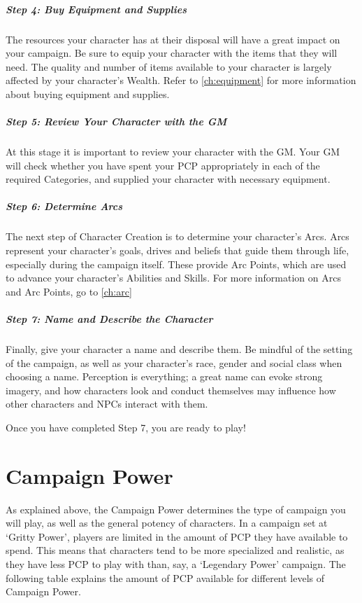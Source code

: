 \documentclass[oneside,11pt,english]{book}
\begin{document}
\subparagraph{Step 4: Buy Equipment and Supplies} The resources your character
has at their disposal will have a great impact on your campaign. Be sure to
equip your character with the items that they will need. The quality and number
of items available to your character is largely affected by your character’s
Wealth. Refer to \autoref{ch:equipment} for more information about buying
equipment and supplies.

\subparagraph{Step 5: Review Your Character with the GM} At this stage it is
important to review your character with the GM. Your GM will check whether you
have spent your PCP appropriately in each of the required Categories, and
supplied your character with necessary equipment.

\subparagraph{Step 6: Determine Arcs} The next step of Character Creation is to
determine your character’s Arcs. Arcs represent your character’s goals, drives
and beliefs that guide them through life, especially during the campaign itself.
These provide Arc Points, which are used to advance your character’s Abilities
and Skills. For more information on Arcs and Arc Points, go to \autoref{ch:arc}

\subparagraph{Step 7: Name and Describe the Character} Finally, give your
character a name and describe them. Be mindful of the setting of the campaign,
as well as your character’s race, gender and social class when choosing a name.
Perception is everything; a great name can evoke strong imagery, and how
characters look and conduct themselves may influence how other characters and
NPCs interact with them.

Once you have completed Step 7, you are ready to play! 

\section{Campaign Power}
As explained above, the Campaign Power determines the type of campaign you will
play, as well as the general potency of characters. In a campaign set at ‘Gritty
Power’, players are limited in the amount of PCP they have available to spend.
This means that characters tend to be more specialized and realistic, as they
have less PCP to play with than, say, a ‘Legendary Power’ campaign. The
following table explains the amount of PCP available for different levels of
Campaign Power.
\end{document}
